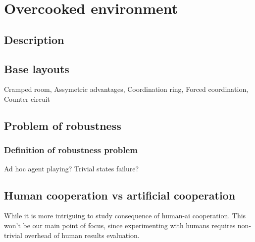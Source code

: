 \chapter{Overcooked environment}

\section{Description}
\section{Base layouts}
Cramped room, Assymetric advantages, Coordination ring, Forced coordination, Counter circuit
\section{Problem of robustness}

\subsection*{Definition of robustness problem}
Ad hoc agent playing? Trivial states failure?

\section{Human cooperation vs artificial cooperation}
While it is more intriguing to study consequence of human-ai cooperation. This won't be our main point of focus, since experimenting with humans requires non-trivial overhead of human results evaluation.

